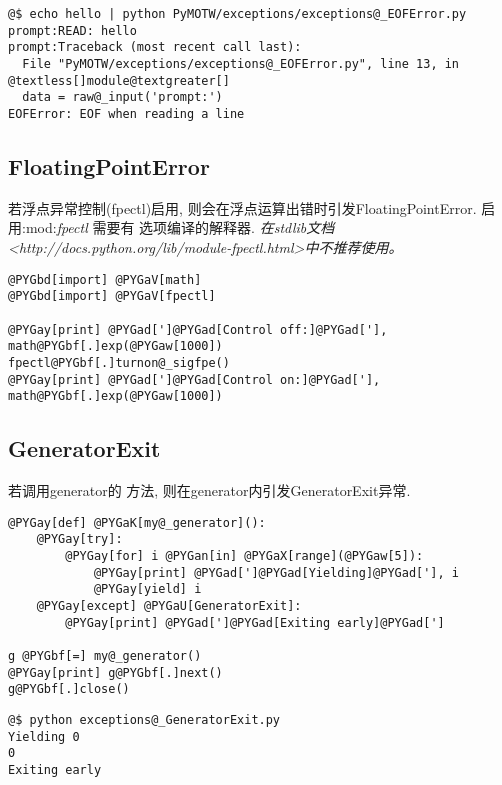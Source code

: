 \documentclass[a4paper,10pt,english]{manual}
\begin{document}
\begin{Verbatim}[commandchars=@\[\]]
@$ echo hello | python PyMOTW/exceptions/exceptions@_EOFError.py
prompt:READ: hello
prompt:Traceback (most recent call last):
  File "PyMOTW/exceptions/exceptions@_EOFError.py", line 13, in @textless[]module@textgreater[]
  data = raw@_input('prompt:')
EOFError: EOF when reading a line
\end{Verbatim}


\subsection{FloatingPointError}

若浮点异常控制(fpectl)启用, 则会在浮点运算出错时引发FloatingPointError. 启用:mod:\emph{fpectl} 需要有  选项编译的解释器.   \emph{在stdlib文档 \textless{}http://docs.python.org/lib/module-fpectl.html\textgreater{}中不推荐使用。}

\begin{Verbatim}[commandchars=@\[\]]
@PYGbd[import] @PYGaV[math]
@PYGbd[import] @PYGaV[fpectl]

@PYGay[print] @PYGad[']@PYGad[Control off:]@PYGad['], math@PYGbf[.]exp(@PYGaw[1000])
fpectl@PYGbf[.]turnon@_sigfpe()
@PYGay[print] @PYGad[']@PYGad[Control on:]@PYGad['], math@PYGbf[.]exp(@PYGaw[1000])
\end{Verbatim}


\subsection{GeneratorExit}

若调用generator的  方法, 则在generator内引发GeneratorExit异常.

\begin{Verbatim}[commandchars=@\[\]]
@PYGay[def] @PYGaK[my@_generator]():
    @PYGay[try]:
        @PYGay[for] i @PYGan[in] @PYGaX[range](@PYGaw[5]):
            @PYGay[print] @PYGad[']@PYGad[Yielding]@PYGad['], i
            @PYGay[yield] i
    @PYGay[except] @PYGaU[GeneratorExit]:
        @PYGay[print] @PYGad[']@PYGad[Exiting early]@PYGad[']

g @PYGbf[=] my@_generator()
@PYGay[print] g@PYGbf[.]next()
g@PYGbf[.]close()
\end{Verbatim}

\begin{Verbatim}[commandchars=@\[\]]
@$ python exceptions@_GeneratorExit.py
Yielding 0
0
Exiting early
\end{Verbatim}
\end{document}
